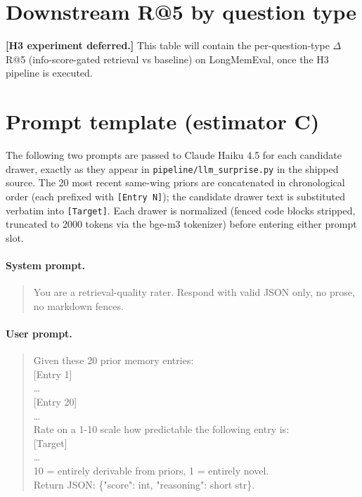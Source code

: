 \section{Downstream R@5 by question type}
\textbf{[H3 experiment deferred.]} This table will contain the
per-question-type $\Delta$R@5 (info-score-gated retrieval vs baseline)
on LongMemEval, once the H3 pipeline is executed.

\section{Prompt template (estimator C)}
The following two prompts are passed to Claude Haiku 4.5 for each
candidate drawer, exactly as they appear in
\texttt{pipeline/llm\_surprise.py} in the shipped source. The 20 most
recent same-wing priors are concatenated in chronological order (each
prefixed with \texttt{[Entry N]}); the candidate drawer text is
substituted verbatim into \texttt{[Target]}. Each drawer is
normalized (fenced code blocks stripped, truncated to 2000 tokens
via the bge-m3 tokenizer) before entering either prompt slot.

\paragraph{System prompt.}
\begin{quote}
\ttfamily\small
You are a retrieval-quality rater. Respond with valid JSON only, no
prose, no markdown fences.
\end{quote}

\paragraph{User prompt.}
\begin{quote}
\ttfamily\small
Given these 20 prior memory entries:\\[0.4em]
[Entry 1]\\
\ldots\\[0.4em]
[Entry 20]\\
\ldots\\[0.4em]
Rate on a 1-10 scale how predictable the following entry is:\\[0.4em]
[Target]\\
\ldots\\[0.4em]
10 = entirely derivable from priors, 1 = entirely novel.\\
Return JSON: \{"score": int, "reasoning": short str\}.
\end{quote}

